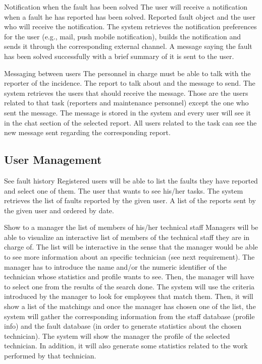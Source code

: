 \begin{requirement}{Notification when the fault has been solved}
\reqdesc The user will receive a notification when a fault he has reported has been solved.
\reqin Reported fault object and the user who will receive the notification.
\reqsteps The system retrieves the notification preferences for the user (e.g., mail, push mobile notification), builds the notification and sends it through the corresponding external channel.
\reqout A message saying the fault has been solved successfully with a brief summary of it is sent to the user.
\end{requirement}

\begin{requirement}{Messaging between users}
\reqdesc The personnel in charge must be able to talk with the reporter of the incidence.
\reqin The report to talk about and the message to send.
\reqsteps The system retrieves the users that should receive the message. Those are the users related to that task (reporters and maintenance personnel) except the one who sent the message. The message is stored in the system and every user will see it in the chat section of the selected report.
\reqout All users related to the task can see the new message sent regarding the corresponding report.
\end{requirement}


\subsection{User Management}

\begin{requirement}{See fault history}
\reqdesc Registered users will be able to list the faults they have reported and select one of them.
\reqin The user that wants to see his/her tasks.
\reqsteps The system retrieves the list of faults reported by the given user.
\reqout A list of the reports sent by the given user and ordered by date.
\end{requirement}

\begin{requirement}{Show to a manager the list of members of his/her technical staff}
\reqdesc Managers will be able to visualize an interactive list of members of the technical staff they are in charge of. The list will be interactive in the sense that the manager would be able to see more information about an specific technician (see next requirement).
\reqin The manager has to introduce the name and/or the numeric identifier of the technician whose statistics and profile wants to see. Then, the manager will have to select one from the results of the search done.
\reqsteps The system will use the criteria introduced by the manager to look for employees that match them. Then, it will show a list of the matchings and once the manager has chosen one of the list, the system will gather the corresponding information from the staff database (profile info) and the fault database (in order to generate statistics about the chosen technician).
\reqout The system will show the manager the profile of the selected technician. In addition, it will also generate some statistics related to the work performed by that technician.
\end{requirement}

